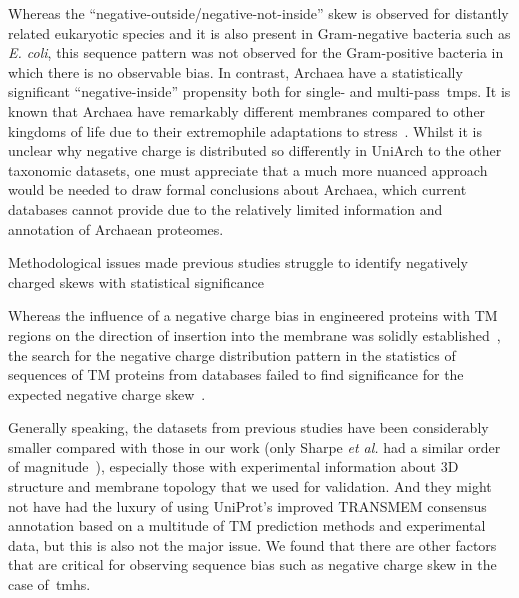 Whereas the ``negative-outside/negative-not-inside'' skew is observed for distantly related eukaryotic species and it is also present in Gram-negative bacteria such as \textit{E.
coli}, this sequence pattern was not observed for the Gram-positive bacteria in which there is no observable bias.
In contrast, Archaea have a statistically significant ``negative-inside'' propensity both for single- and multi-pass~\gls{tmp}s.
It is known that Archaea have remarkably different membranes compared to other kingdoms of life due to their extremophile adaptations to stress~\cite{Oger2013}.
Whilst it is unclear why negative charge is distributed so differently in UniArch to the other taxonomic datasets, one must appreciate that a much more nuanced approach would be needed to draw formal conclusions about Archaea, which current databases cannot provide due to the relatively limited information and annotation of Archaean proteomes.

Methodological issues made previous studies struggle to identify negatively charged skews with statistical significance

Whereas the influence of a negative charge bias in engineered proteins with TM regions on the direction of insertion into the membrane was solidly established~\cite{Nilsson1990, Andersson1993, Kim1994, Andersson1992, Rutz1999}, the search for the negative charge distribution pattern in the statistics of sequences of TM proteins from databases failed to find significance for the expected negative charge skew~\cite{Sharpe2010, Baeza-Delgado2013, Granseth2005, Pogozheva2013, Nilsson2005a, Andersson1992}.

Generally speaking, the datasets from previous studies have been considerably smaller compared with those in our work (only Sharpe \textit{et al.} had a similar order of magnitude~\cite{Sharpe2010}), especially those with experimental information about 3D structure and membrane topology that we used for validation.
And they might not have had the luxury of using UniProt’s improved TRANSMEM consensus annotation based on a multitude of TM prediction methods and experimental data, but this is also not the major issue.
We found that there are other factors that are critical for observing sequence bias such as negative charge skew in the case of~\gls{tmh}s.

